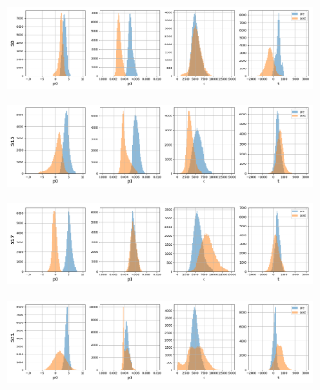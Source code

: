 \begin{figure}
\centering
\begin{subfigure}[H]{1.\textwidth}
    \centering
    \includegraphics[width=\linewidth]{figures/chapter4/surrogates/p1_S8_histos.png}
  \end{subfigure}

\begin{subfigure}[b]{1.\textwidth}
    \centering
    \includegraphics[width=\linewidth]{figures/chapter4/surrogates/p1_S16_histos.png}
  \end{subfigure}

\begin{subfigure}[b]{1.\textwidth}
    \centering
    \includegraphics[width=\linewidth]{figures/chapter4/surrogates/p1_S17_histos.png}
  \end{subfigure}

\begin{subfigure}[b]{1.\textwidth}
    \centering
    \includegraphics[width=\linewidth]{figures/chapter4/surrogates/p1_S21_histos.png}
  \end{subfigure}


\end{figure}
